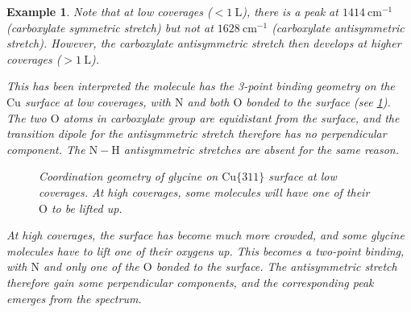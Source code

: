 \documentclass{article}
\theoremstyle{plain}\theoremheaderfont{\normalfont\itshape}\theorembodyfont{\rmfamily}\theoremseparator{.}\newtheorem*{rem}{Remark}\newtheorem*{ex}{Example}\newtheorem*{proof}{Proof}\newtheorem*{altp}{Alternative proof}
\theoremstyle{plain}\theoremheaderfont{\normalfont\bfseries}\theorembodyfont{\rmfamily}\theoremseparator{.}\newtheorem{thm}{Theorem}[section]\newtheorem{lem}[thm]{Lemma}\newtheorem{prop}[thm]{Proposition}\newtheorem*{cor}{Corollary}\newtheorem{defn}[thm]{Definition}\newtheorem{clm}[thm]{Claim}\newtheorem{clminproof}{Claim}\newtheorem*{law}{Law}\newtheorem{pos}[thm]{Postulate}
\theoremstyle{break}\theoremheaderfont{\normalfont\itshape}\theorembodyfont{\rmfamily}\theoremseparator{.\medskip}\newtheorem*{proofskip}{Proof}\newtheorem*{exs}{Examples}\newtheorem*{rems}{Remarks}
\theoremstyle{break}\theoremheaderfont{\normalfont\bfseries}\theorembodyfont{\rmfamily}\theoremseparator{.\medskip}\newtheorem{lemskip}[thm]{Lemma}\newtheorem{defnskip}[thm]{Definition}\newtheorem{propskip}[thm]{Proposition}\newtheorem{thmskip}[thm]{Theorem}
\numberwithin{equation}{section}
\newcommand{\unit}[1]{\ \mathrm{#1}}
\begin{document}
\begin{ex}
		Note that at low coverages (\(<1\unit{L}\)), there is a peak at \(1414\unit{cm}^{-1}\) (carboxylate symmetric stretch) but not at \(1628\unit{cm}^{-1}\) (carboxylate antisymmetric stretch). However, the carboxylate antisymmetric stretch then develops at higher coverages (\(>1\unit{L}\)).
		
		This has been interpreted the molecule has the 3-point binding geometry on the \(\mathrm{Cu}\) surface at low coverages, with \(\mathrm{N}\) and both \(\mathrm{O}\) bonded to the surface (see \cref{Fig:three_point_binding}). The two \(\mathrm{O}\) atoms in carboxylate group are equidistant from the surface, and the transition dipole for the antisymmetric stretch therefore has no perpendicular component. The \(\mathrm{N-H}\) antisymmetric stretches are absent for the same reason.

		\begin{figure}[ht!]
			\centering
			\caption{Coordination geometry of glycine on \(\mathrm{Cu}\{311\}\) surface at low coverages. At high coverages, some molecules will have one of their \(\mathrm{O}\) to be lifted up.}
			\label{Fig:three_point_binding}
		\end{figure}
		
		At high coverages, the surface has become much more crowded, and some glycine molecules have to lift one of their oxygens up. This becomes a two-point binding, with \(\mathrm{N}\) and only one of the \(\mathrm{O}\) bonded to the surface. The antisymmetric stretch therefore gain some perpendicular components, and the corresponding peak emerges from the spectrum.
	\end{ex}
\end{document}

